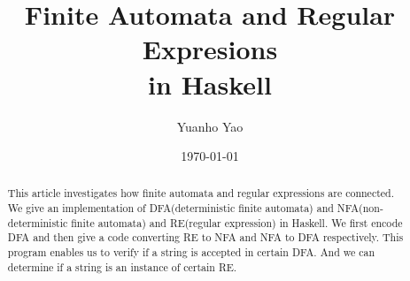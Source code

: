 \documentclass[12pt,a4paper]{article}
\title{Finite Automata and Regular Expresions \\in Haskell}
\author{Yuanho Yao}
\date{\today}
\begin{document}
\maketitle

\begin{abstract}
  This article investigates how finite automata and regular expressions are connected. We give an implementation of DFA(deterministic finite automata) and NFA(non-deterministic finite automata) and RE(regular expression) in Haskell.
  We first encode DFA and then give a code converting RE to NFA and NFA to DFA respectively.
  This program enables us to verify if a string is accepted in certain DFA. And we can determine if a string is an instance of certain RE.
\end{abstract}

\vfill

\tableofcontents

\clearpage





\end{document}
